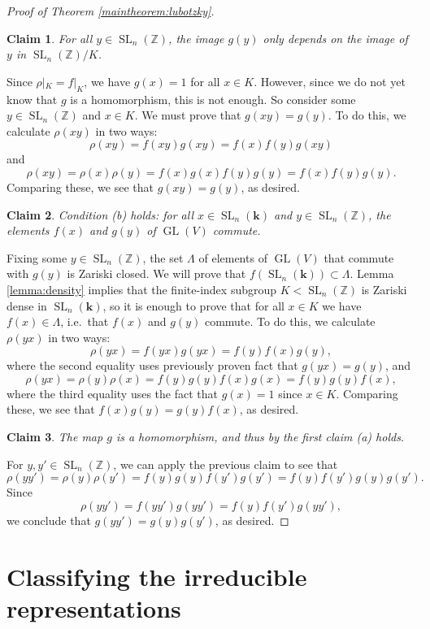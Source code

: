 \documentclass[11pt]{article}
\numberwithin{equation}{section}
\theoremstyle{plain}
\newtheorem{claima}{Claim}
\theoremstyle{definition}
\theoremstyle{remark}
\DeclareMathOperator{\GL}{GL}
\DeclareMathOperator{\SL}{SL}
\newcommand\Z{\ensuremath{\mathbb{Z}}}
\newcommand\bk{\ensuremath{\mathbf{k}}}
\begin{document}
\begin{proof}[Proof of Theorem \ref{maintheorem:lubotzky}]
\begin{claima}
For all $y \in \SL_n(\Z)$, the image $g(y)$ only depends on the image of $y$ in $\SL_n(\Z)/K$.
\end{claima}

Since $\rho|_K = f|_K$, we have $g(x) = 1$ for all $x \in K$.  However, since we do not yet know
that $g$ is a homomorphism, this is not enough.  So consider some $y \in \SL_n(\Z)$ and $x \in K$.
We must prove that $g(xy) = g(y)$.  To do this, we calculate $\rho(xy)$ in two ways:
\[\rho(xy) = f(xy) g(xy)
= f(x) f(y) g(xy)\]
and
\[\rho(xy) = \rho(x) \rho(y)
= f(x) g(x) f(y) g(y)
= f(x) f(y) g(y).\]
Comparing these, we see that $g(xy) = g(y)$, as desired.

\begin{claima}
Condition (b) holds: for all $x \in \SL_n(\bk)$ and $y \in \SL_n(\Z)$, the elements $f(x)$ and $g(y)$ of $\GL(V)$ commute.
\end{claima}

Fixing some $y \in \SL_n(\Z)$, the set $\Lambda$ of elements of $\GL(V)$ that commute with $g(y)$ is Zariski closed.
We will prove that $f(\SL_n(\bk)) \subset \Lambda$.  Lemma \ref{lemma:density} implies that 
the finite-index subgroup $K < \SL_n(\Z)$
is Zariski dense in $\SL_n(\bk)$, so it is enough to prove that for all $x \in K$ we have $f(x) \in \Lambda$, i.e.\ that
$f(x)$ and $g(y)$ commute.  To do this, we calculate $\rho(yx)$ in two ways:
\[\rho(yx) = f(yx) g(yx)
= f(y) f(x) g(y),\]
where the second equality uses previously proven fact that $g(yx) = g(y)$, and
\[\rho(yx) = \rho(y) \rho(x)
= f(y) g(y) f(x) g(x) 
= f(y) g(y) f(x),\]
where the third equality uses the fact that $g(x) = 1$ since $x \in K$.  Comparing these, we see that
$f(x) g(y) = g(y) f(x)$, as desired.

\begin{claima}
The map $g$ is a homomorphism, and thus by the first claim (a) holds.
\end{claima}

For $y,y' \in \SL_n(\Z)$, we can apply the previous claim to see that
\[\rho(y y') = \rho(y) \rho(y')
= f(y) g(y) f(y') g(y')
= f(y) f(y') g(y) g(y').\]
Since
\[\rho(y y') = f(y y') g(y y') = f(y) f(y') g(y y'),\]
we conclude that $g(y y') = g(y) g(y')$, as desired.
\end{proof}

\section{Classifying the irreducible representations}
\label{section:irreducible}
\end{document}
